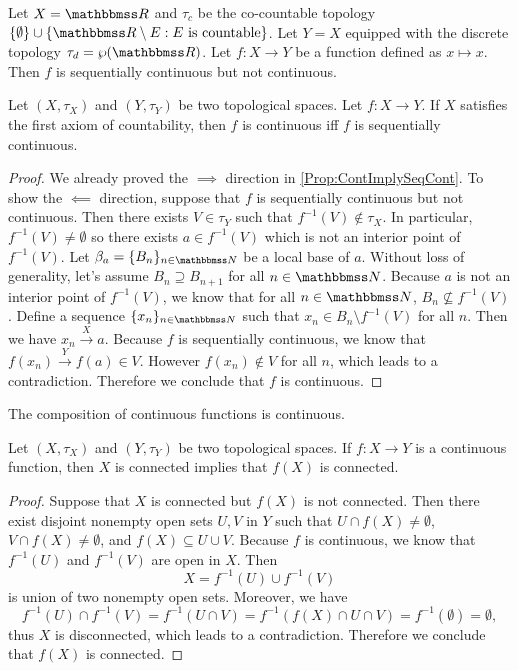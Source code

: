 \documentclass[screen,single]{techreport}
\numberwithin{equation}{section}
\begin{document}
\begin{example}\label{Exa:SeqContNotCont}
	Let $X = \bbR$ and $\tau_c$ be the co-countable topology $\{ \emptyset \} \cup \{ \bbR \setminus E : E~\text{is countable} \}$.
	Let $Y = X$ equipped with the discrete topology $\tau_d = \wp(\bbR)$.
	Let $f : X \to Y$ be a function defined as $x \mapsto x$.
	Then $f$ is sequentially continuous but not continuous.
\end{example}

\begin{proposition}\label{Prop:FstAxCountContIffSeqCont}
	Let $(X,\tau_X)$ and $(Y,\tau_Y)$ be two topological spaces.
	Let $f : X\to Y$.
	If $X$ satisfies the first axiom of countability, then $f$ is continuous iff $f$ is sequentially continuous.
\end{proposition}
\begin{proof}
	We already proved the ${\implies}$ direction in \cref{Prop:ContImplySeqCont}.
	To show the ${\impliedby}$ direction, suppose that $f$ is sequentially continuous but not continuous.
	Then there exists $V \in \tau_Y$ such that $f^{-1}(V) \not\in \tau_X$.
	In particular, $f^{-1}(V) \neq \emptyset$ so there exists $a \in f^{-1}(V)$ which is not an interior point of $f^{-1}(V)$.
	Let $\beta_a = \{B_n\}_{n\in \bbN}$ be a local base of $a$.
	Without loss of generality, let's assume $B_n \supseteq B_{n+1}$ for all $n \in \bbN$.
	Because $a$ is not an interior point of $f^{-1}(V)$, we know that for all $n \in \bbN$, $B_n \not\subseteq f^{-1}(V)$.
	Define a sequence $\{x_n\}_{n \in \bbN}$ such that $x_n \in B_n \setminus f^{-1}(V)$ for all $n$.
	Then we have $x_n \xrightarrow{X} a$.
	Because $f$ is sequentially continuous, we know that $f(x_n) \xrightarrow{Y} f(a) \in V$.
	However $f(x_n) \not\in V$ for all $n$, which leads to a contradiction.
	Therefore we conclude that $f$ is continuous.
\end{proof}

\begin{proposition}\label{Prop:ContCompIsCont}
	The composition of continuous functions is continuous.
\end{proposition}

\begin{proposition}\label{Prop:ContPreserveConn}
	Let $(X,\tau_X)$ and $(Y,\tau_Y)$ be two topological spaces.
	If $f : X \to Y$ is a continuous function, then $X$ is connected implies that $f(X)$ is connected.
\end{proposition}
\begin{proof}
	Suppose that $X$ is connected but $f(X)$ is not connected.
	Then there exist disjoint nonempty open sets $U,V$ in $Y$ such that $U \cap f(X) \neq \emptyset$, $V \cap f(X) \neq \emptyset$, and $f(X) \subseteq U \cup V$.
	Because $f$ is continuous, we know that $f^{-1}(U)$ and $f^{-1}(V)$ are open in $X$.
	Then
	\[
	X = f^{-1}(U) \cup f^{-1}(V)
	\]
	is union of two nonempty open sets.
	Moreover, we have
	\[
	f^{-1}(U) \cap f^{-1}(V) = f^{-1}(U \cap V) = f^{-1}(f(X) \cap U \cap V) = f^{-1}(\emptyset) = \emptyset,
	\]
	thus $X$ is disconnected, which leads to a contradiction.
	Therefore we conclude that $f(X)$ is connected.
\end{proof}
\end{document}
